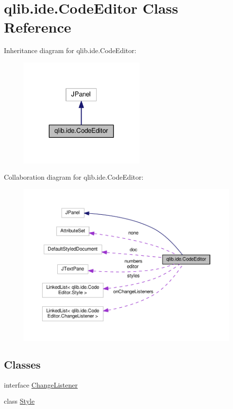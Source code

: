 \hypertarget{classqlib_1_1ide_1_1CodeEditor}{}\section{qlib.\+ide.\+Code\+Editor Class Reference}
\label{classqlib_1_1ide_1_1CodeEditor}


Inheritance diagram for qlib.\+ide.\+Code\+Editor\+:\nopagebreak
\begin{figure}[H]
\begin{center}
\leavevmode
\includegraphics[width=179pt]{classqlib_1_1ide_1_1CodeEditor__inherit__graph}
\end{center}
\end{figure}


Collaboration diagram for qlib.\+ide.\+Code\+Editor\+:\nopagebreak
\begin{figure}[H]
\begin{center}
\leavevmode
\includegraphics[width=350pt]{classqlib_1_1ide_1_1CodeEditor__coll__graph}
\end{center}
\end{figure}
\subsection*{Classes}
\begin{DoxyCompactItemize}
\item 
interface \hyperlink{interfaceqlib_1_1ide_1_1CodeEditor_1_1ChangeListener}{Change\+Listener}
\item 
class \hyperlink{classqlib_1_1ide_1_1CodeEditor_1_1Style}{Style}
\end{DoxyCompactItemize}
